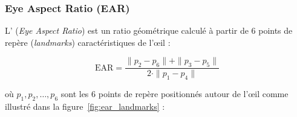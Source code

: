 \subsubsection{Eye Aspect Ratio (EAR)}

L' (\textit{Eye Aspect Ratio}) \cite{soukupova2016} est un ratio géométrique calculé à partir de 6 points de repère (\textit{landmarks}) caractéristiques de l'œil :

\begin{equation}
\boxed{
\text{EAR} = \frac{\|p_2 - p_6\| + \|p_3 - p_5\|}{2 \cdot \|p_1 - p_4\|}
}
\label{eq:ear}
\end{equation}

où $p_1, p_2, \ldots, p_6$ sont les 6 points de repère positionnés autour de l'œil comme illustré dans la figure~\ref{fig:ear_landmarks} :

